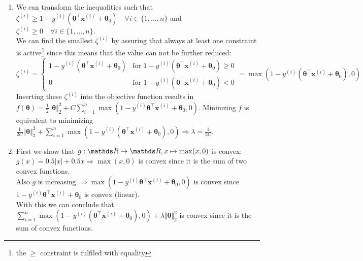 \documentclass[a4paper]{article}
\begin{document}
{\begin{enumerate}
\item We can transform the inequalities such that \\
$\zeta^{(i)} \geq 1 - y^{(i)}\left( \bm{\theta}^\top\mathbf{x}^{(i)} + \bm{\theta}_0\right) \quad \forall i \in \{1,\dots,n\}$ and $\zeta^{(i)} \geq 0 \quad \forall i \in \{1, \dots, n\}.$\\
We can find the smallest $\zeta^{(i)}$ by assuring that always at least one constraint is active\footnote{the $\geq$ constraint is fulfiled with equality} since this means that the value can not be further reduced:\\
$\zeta^{(i)} = \begin{cases} 1 - y^{(i)}\left( \bm{\theta}^\top\mathbf{x}^{(i)} + \bm{\theta}_0\right) & \text{for } 1 - y^{(i)}\left( \bm{\theta}^\top\mathbf{x}^{(i)} + \bm{\theta}_0\right) \geq 0 \\
0 & \text{for } 1 - y^{(i)}\left( \bm{\theta}^\top\mathbf{x}^{(i)} + \bm{\theta}_0\right) < 0
\end{cases} = \max(1 - y^{(i)}\left( \bm{\theta}^\top\mathbf{x}^{(i)} + \bm{\theta}_0\right), 0)$ \\
Inserting these $\zeta^{(i)}$ into the objective function results in $f(\bm{\theta}) =
\frac{1}{2}\Vert\bm{\theta}\Vert^2_2 + C\sum^n_{i=1}\max(1-y^{(i)}\bm{\theta}^\top\mathbf{x}^{(i)} + \bm{\theta}_0, 0).$
Minimzing $f$ is equivalent to minimizing $\frac{1}{2C}\Vert\bm{\theta}\Vert^2_2 + \sum^n_{i=1}\max(1-y^{(i)}(\bm{\theta}^\top\mathbf{x}^{(i)} + \bm{\theta}_0), 0) \Rightarrow \lambda = \frac{1}{2C}.$

\item First we show that $g:\R \rightarrow \R, x \mapsto \max(x, 0)$ is convex: \\
$g(x) = 0.5\vert x \vert + 0.5x \Rightarrow \max(x, 0)$ is convex since it is the sum of two convex functions. \\
Also $g$ is increasing $\Rightarrow \max(1-y^{(i)}\bm{\theta}^\top\mathbf{x}^{(i)} + \bm{\theta}_0, 0)$ is convex since $1-y^{(i)}\bm{\theta}^\top\mathbf{x}^{(i)} + \bm{\theta}_0$ is convex (linear). \\
With this we can conclude that $\sum^n_{i=1}\max(1-y^{(i)}(\bm{\theta}^\top\mathbf{x}^{(i)} + \bm{\theta}_0), 0) + \lambda\Vert\bm{\theta}\Vert^2_2$ is convex since it is the sum of convex functions.

\end{enumerate}
}
\end{document}
